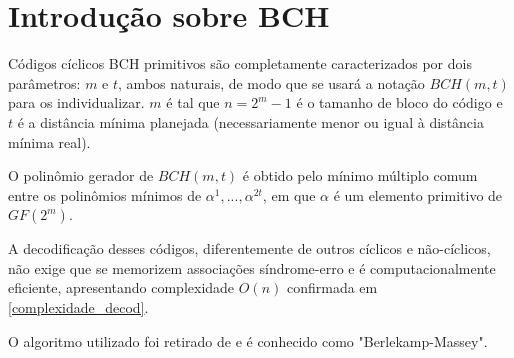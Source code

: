 \section{Introdução sobre BCH}

Códigos cíclicos BCH primitivos são completamente caracterizados por dois parâmetros: $m$ e $t$, ambos naturais, de modo que se usará a notação $BCH(m,t)$ para os individualizar. $m$ é tal que $n=2^m-1$ é o tamanho de bloco do código e $t$ é a distância mínima planejada (necessariamente menor ou igual à distância mínima real). 

O polinômio gerador de $BCH(m,t)$ é obtido pelo mínimo múltiplo comum entre os polinômios mínimos de $\alpha^1, ..., \alpha^{2t}$, em que $\alpha$ é um elemento primitivo de $GF(2^m)$.

A decodificação desses códigos, diferentemente de outros cíclicos e não-cíclicos, não exige que se memorizem associações síndrome-erro e é computacionalmente eficiente, apresentando complexidade $O(n)$ confirmada em \ref{complexidade_decod}.

O algoritmo utilizado foi retirado de \cite{ref:algoritmo-berlekamp} e é conhecido como "Berlekamp-Massey".